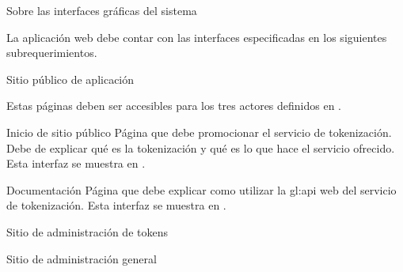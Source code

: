 {Sobre las interfaces gráficas del sistema}
{
  La aplicación web debe contar con las interfaces especificadas en los
  siguientes subrequerimientos.

  {Sitio público de aplicación}
  {
    Estas páginas deben ser accesibles para los tres actores definidos en
    .

    {Inicio de sitio público}
    {
      Página que debe promocionar el servicio de tokenización. Debe de explicar
      qué es la tokenización y qué es lo que hace el servicio ofrecido. Esta
      interfaz se muestra en .
    }

    {Documentación}
    {
      Página que debe explicar como utilizar la \gls{gl:api} web del
      servicio de tokenización. Esta interfaz se muestra en
      .
    }
  }

  {Sitio de administración de tokens}
  {

  }

  {Sitio de administración general}
  {

  }
}

